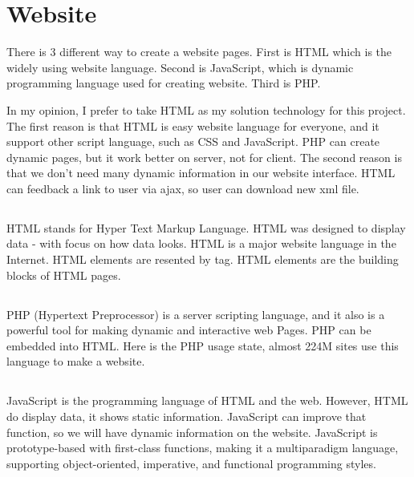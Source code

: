 \section{Website}
There is 3 different way to create a website pages. First is HTML which is the widely using website language. Second is JavaScript, which is dynamic programming language used for creating website. Third is PHP.

In my opinion, I prefer to take HTML as my solution technology for this project. The first reason is that HTML is easy website language for everyone, and it support other script language, such as CSS and JavaScript. PHP can create dynamic pages, but it work better on server, not for client. The second reason is that we don't need many dynamic information in our website interface. HTML can feedback a link to user via ajax, so user can download new xml file.

\subsection{}
HTML stands for Hyper Text Markup Language. HTML was designed to display data - with focus on how data looks. HTML is a major website language in the Internet. HTML elements are resented by tag. HTML elements are the building blocks of HTML pages.

\subsection{}
PHP (Hypertext Preprocessor) is a server scripting language, and it also is a powerful tool for making dynamic and interactive web Pages. PHP can be embedded into HTML. Here is the PHP usage state, almost 224M sites use this language to make a website.

\subsection{}
JavaScript is the programming language of HTML and the web. However, HTML do display data, it shows static information. JavaScript can improve that function, so we will have dynamic information on the website. JavaScript is prototype-based with first-class functions, making it a multiparadigm language, supporting object-oriented, imperative, and functional programming styles.